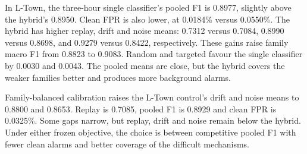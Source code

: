 In L-Town, the three-hour single classifier's pooled F1 is 0.8977, slightly above the hybrid's 0.8950. Clean FPR is also lower, at 0.0184\% versus 0.0550\%. The hybrid has higher replay, drift and noise means: 0.7312 versus 0.7084, 0.8990 versus 0.8698, and 0.9279 versus 0.8422, respectively. These gains raise family macro F1 from 0.8823 to 0.9083. Random and targeted favour the single classifier by 0.0030 and 0.0043. The pooled means are close, but the hybrid covers the weaker families better and produces more background alarms.

Family-balanced calibration raises the L-Town control's drift and noise means to 0.8800 and 0.8653. Replay is 0.7085, pooled F1 is 0.8929 and clean FPR is 0.0325\%. Some gaps narrow, but replay, drift and noise remain below the hybrid. Under either frozen objective, the choice is between competitive pooled F1 with fewer clean alarms and better coverage of the difficult mechanisms.
